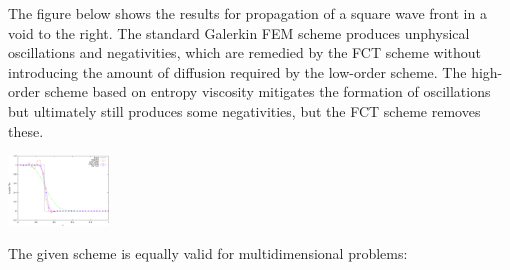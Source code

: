 The figure below shows the results for propagation of a square wave
front in a void to the right. The standard Galerkin FEM scheme produces unphysical
oscillations and negativities, which are remedied by the FCT scheme without
introducing the amount of diffusion required by the low-order scheme. The
high-order scheme based on entropy viscosity mitigates the formation of
oscillations but ultimately still produces some negativities, but the
FCT scheme removes these.

\includegraphics[width=0.20\textwidth]{figures/solutions_3_SSPRK33.pdf}

The given scheme is equally valid for multidimensional problems:
\vspace{\baselineskip}

